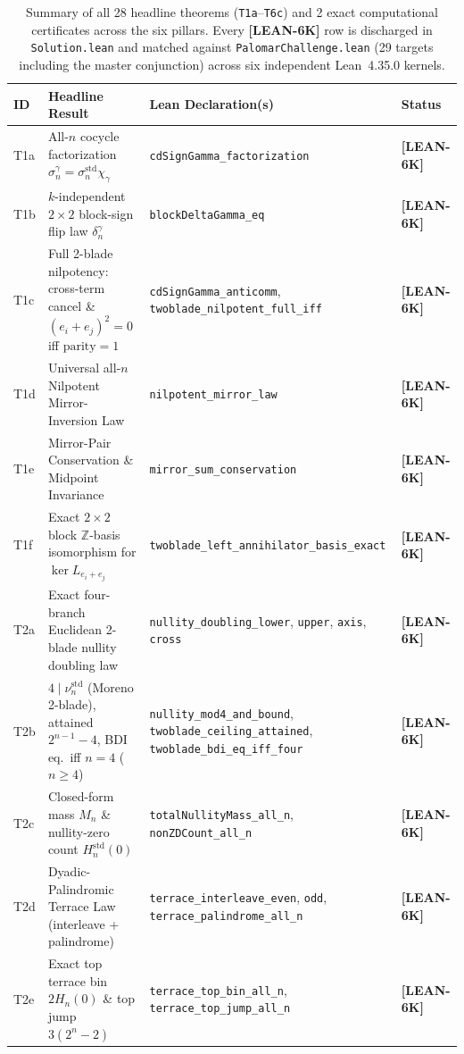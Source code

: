 \documentclass[11pt,reqno]{amsart}
\newcommand{\code}[1]{\textnormal{\texttt{\small\nolinkurl{#1}}}}
\theoremstyle{plain}
\theoremstyle{definition}
\theoremstyle{remark}
\newcommand{\tagLean}{\mbox{\textsf{\textbf{\color{oiBlue}[LEAN-6K]}}}}
\newcommand{\Z}{\mathbb{Z}}
\newcommand{\std}{\mathrm{std}}
\newcommand{\parbit}{\mathrm{parity}}
\begin{document}
\begin{table}[htbp]
\centering
\caption{Summary of all 28 headline theorems (\code{T1a}--\code{T6c}) and 2 exact computational
certificates across the six pillars. Every \tagLean{} row is discharged in \code{Solution.lean}
and matched against \code{PalomarChallenge.lean} (29 targets including the master conjunction)
across six independent Lean~4.35.0 kernels.}
\label{tab:headline_theorems}
\scriptsize
\renewcommand{\arraystretch}{0.95}
\setlength{\tabcolsep}{3.0pt}
\begin{tabularx}{\textwidth}{@{}l >{\raggedright\arraybackslash}p{6.0cm} >{\raggedright\arraybackslash}X l@{}}
\toprule
ID & Headline Result & Lean Declaration(s) & Status \\
\midrule
T1a & All-$n$ cocycle factorization $\sigma_n^\gamma = \sigma_n^{\std}\chi_\gamma$ & \code{cdSignGamma_factorization} & \tagLean \\
T1b & $k$-independent $2\times 2$ block-sign flip law $\delta_n^\gamma$ & \code{blockDeltaGamma_eq} & \tagLean \\
T1c & Full 2-blade nilpotency: cross-term cancel \& $(e_i+e_j)^2=0$ iff $\parbit=1$ & \code{cdSignGamma_anticomm}, \code{twoblade_nilpotent_full_iff} & \tagLean \\
T1d & Universal all-$n$ Nilpotent Mirror-Inversion Law & \code{nilpotent_mirror_law} & \tagLean \\
T1e & Mirror-Pair Conservation \& Midpoint Invariance & \code{mirror_sum_conservation} & \tagLean \\
T1f & Exact $2\times 2$ block $\Z$-basis isomorphism for $\ker L_{e_i+e_j}$ & \code{twoblade_left_annihilator_basis_exact} & \tagLean \\
\addlinespace[2pt]
T2a & Exact four-branch Euclidean 2-blade nullity doubling law & \code{nullity_doubling_lower}, \code{upper}, \code{axis}, \code{cross} & \tagLean \\
T2b & $4\mid \nu_n^{\std}$ (Moreno 2-blade), attained $2^{n-1}-4$, BDI eq.\ iff $n=4$ ($n\ge 4$) & \code{nullity_mod4_and_bound}, \code{twoblade_ceiling_attained}, \code{twoblade_bdi_eq_iff_four} & \tagLean \\
T2c & Closed-form mass $M_n$ \& nullity-zero count $H_n^{\std}(0)$ & \code{totalNullityMass_all_n}, \code{nonZDCount_all_n} & \tagLean \\
T2d & Dyadic-Palindromic Terrace Law (interleave + palindrome) & \code{terrace_interleave_even}, \code{odd}, \code{terrace_palindrome_all_n} & \tagLean \\
T2e & Exact top terrace bin $2H_n(0)$ \& top jump $3(2^n-2)$ & \code{terrace_top_bin_all_n}, \code{terrace_top_jump_all_n} & \tagLean \\

\end{tabularx}
\end{table}
\end{document}
